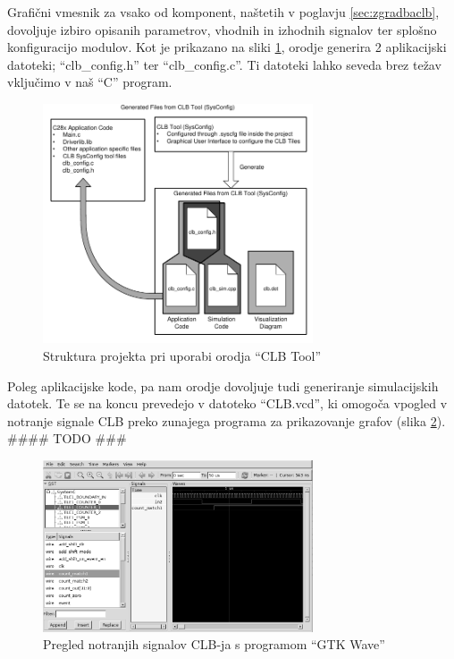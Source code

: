 \documentclass[a4paper]{article}
\begin{document}
\begin{sloppypar}
Grafični vmesnik za vsako od komponent, naštetih v poglavju
\ref{sec:zgradbaclb}, dovoljuje izbiro opisanih parametrov, vhodnih in izhodnih
signalov ter splošno konfiguracijo modulov. Kot je prikazano na sliki
\ref{fig:clbtool_struktura}, orodje generira 2 aplikacijski datoteki;
``clb\_config.h'' ter ``clb\_config.c''. Ti datoteki lahko seveda brez težav
vključimo v naš ``C'' program.

\begin{figure}[htb]
    \centerline{\includegraphics[width=8cm]{clbtool_struktura}}
    \caption{Struktura projekta pri uporabi orodja ``CLB Tool''
             \cite[Pogl.~1]{clb-user-guide}}
    \label{fig:clbtool_struktura} 
\end{figure} 

Poleg aplikacijske kode, pa nam orodje dovoljuje tudi generiranje simulacijskih
datotek. Te se na koncu prevedejo v datoteko ``CLB.vcd'', ki omogoča vpogled v
notranje signale CLB preko zunajega programa za prikazovanje grafov (slika
\ref{fig:clbtool_simulacija}). #### TODO ###

\begin{figure}[htb]
    \centerline{\includegraphics[width=8cm]{gtkwave}}
    \caption{Pregled notranjih signalov CLB-ja s programom ``GTK Wave''}
    \label{fig:clbtool_simulacija} 
\end{figure} 


\end{sloppypar}
\end{document}
